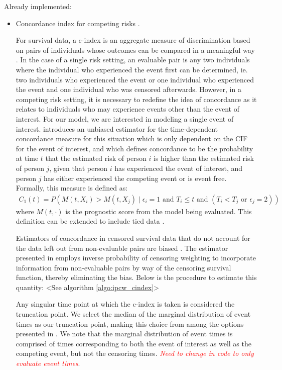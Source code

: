\documentclass[11pt,a4paper]{article}
\let\cite\parencite
\begin{document}
Already implemented:
\begin{itemize}
    \item Concordance index for competing risks \cite{Wolbers2014}.

     For survival data, a c-index is an aggregate measure of discrimination based on pairs of individuals whose outcomes can be compared in a meaningful way \cite{Harrell1982}. In the case of a single risk setting, an evaluable pair is any two individuals where the individual who experienced the event first can be determined, ie. two individuals who experienced the event or one individual who experienced the event and one individual who was censored afterwards. However, in a competing risk setting, it is necessary to redefine the idea of concordance as it relates to individuals who may experience events other than the event of interest. For our model, we are interested in modeling a single event of interest. \cite{Wolbers2014} introduces an unbiased estimator for the time-dependent concordance measure for this situation which is only dependent on the CIF for the event of interest, and which defines concordance to be the probability at time $t$ that the estimated risk of person $i$ is higher than the estimated risk of person $j$, given that person $i$ has experienced the event of interest, and person $j$ has either experienced the competing event or is event free. Formally, this measure is defined as:
     \begin{align*}
         C_1(t) = P(M(t,X_i) > M(t,X_j) \mid \epsilon_i = 1 \text{ and } T_i \leq t\text{ and } (T_i < T_j \text{ or } \epsilon_j = 2))
     \end{align*}
     \noindent where $M(t,\cdot)$ is the prognostic score from the model being evaluated. This definition can be extended to include tied data \cite{YanGreene2008}. 
     
     Estimators of concordance in censored survival data that do not account for the data left out from non-evaluable pairs are biased \cite{Uno2011, Gerds2012}. The estimator presented in \cite{Wolbers2014} employs inverse probability of censoring weighting to incorporate information from non-evaluable pairs by way of the censoring survival function, thereby eliminating the bias. Below is the procedure to estimate this quantity:
     <See algorithm \ref{algo:ipcw_cindex}>

     Any singular time point at which the c-index is taken is considered the truncation point. We select the median of the marginal distribution of event times as our truncation point, making this choice from among the options presented in \cite{Wolbers2014}. We note that the marginal distribution of event times is comprised of times corresponding to both the event of interest as well as the competing event, but not the censoring times. \textit{\textcolor{red}{Need to change in code to only evaluate event times}}.

     
     \end{itemize}
\end{document}
